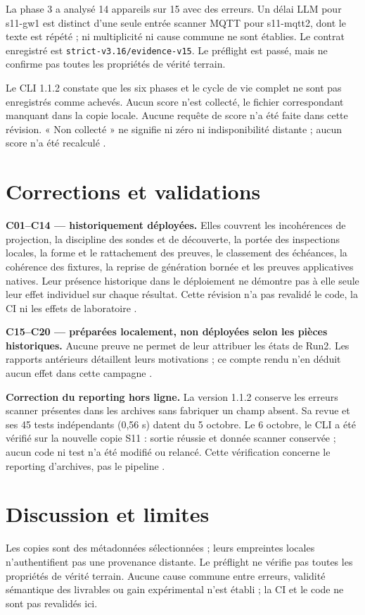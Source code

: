 \documentclass[11pt,a4paper]{article}
\newcommand{\code}[1]{{\urlstyle{tt}\nolinkurl{#1}}}
\begin{document}
La phase 3 a analysé 14 appareils sur 15 avec des erreurs. Un délai LLM pour s11-gw1 est distinct d'une seule entrée scanner MQTT pour s11-mqtt2, dont le texte est répété ; ni multiplicité ni cause commune ne sont établies. Le contrat enregistré est \code{strict-v3.16/evidence-v15}. Le préflight est passé, mais ne confirme pas toutes les propriétés de vérité terrain.

Le CLI 1.1.2 constate que les six phases et le cycle de vie complet ne sont pas enregistrés comme achevés. Aucun score n'est collecté, le fichier correspondant manquant dans la copie locale. Aucune requête de score n'a été faite dans cette révision. « Non collecté » ne signifie ni zéro ni indisponibilité distante ; aucun score n'a été recalculé \cite{inv6,report}.

\section{Corrections et validations}
\textbf{C01–C14 — historiquement déployées.} Elles couvrent les incohérences de projection, la discipline des sondes et de découverte, la portée des inspections locales, la forme et le rattachement des preuves, le classement des échéances, la cohérence des fixtures, la reprise de génération bornée et les preuves applicatives natives. Leur présence historique dans le déploiement ne démontre pas à elle seule leur effet individuel sur chaque résultat. Cette révision n'a pas revalidé le code, la CI ni les effets de laboratoire \cite{journal}.

\textbf{C15–C20 — préparées localement, non déployées selon les pièces historiques.} Aucune preuve ne permet de leur attribuer les états de Run2. Les rapports antérieurs détaillent leurs motivations ; ce compte rendu n'en déduit aucun effet dans cette campagne \cite{journal}.

\textbf{Correction du reporting hors ligne.} La version 1.1.2 conserve les erreurs scanner présentes dans les archives sans fabriquer un champ absent. Sa revue et ses 45 tests indépendants (0,56 s) datent du 5 octobre. Le 6 octobre, le CLI a été vérifié sur la nouvelle copie S11 : sortie réussie et donnée scanner conservée ; aucun code ni test n'a été modifié ou relancé. Cette vérification concerne le reporting d'archives, pas le pipeline \cite{report,inv6}.
\section{Discussion et limites}
Les copies sont des métadonnées sélectionnées ; leurs empreintes locales n'authentifient pas une provenance distante. Le préflight ne vérifie pas toutes les propriétés de vérité terrain. Aucune cause commune entre erreurs, validité sémantique des livrables ou gain expérimental n'est établi ; la CI et le code ne sont pas revalidés ici.
\end{document}
